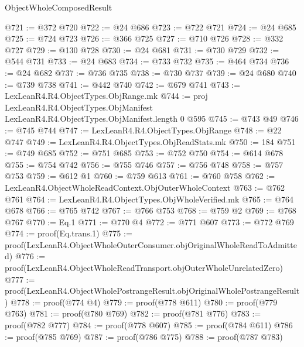 \begin{lexlean}{ObjectWholeComposedResult}
\begin{coremodule}
@721 := @372 @720
@722 := @24 @686
@723 := @722 @721
@724 := @24 @685
@725 := @724 @723
@726 := @366 @725
@727 := @710 @726
@728 := @332 @727
@729 := @130 @728
@730 := @24 @681
@731 := @730 @729
@732 := @544 @731
@733 := @24 @683
@734 := @733 @732
@735 := @464 @734
@736 := @24 @682
@737 := @736 @735
@738 := @730 @737
@739 := @24 @680
@740 := @739 @738
@741 := @442 @740
@742 := @679 @741
@743 := LexLeanR4.R4.ObjectTypes.ObjRange.mk
@744 := proj LexLeanR4.R4.ObjectTypes.ObjManifest LexLeanR4.R4.ObjectTypes.ObjManifest.length 0 @595
@745 := @743 @49
@746 := @745 @744
@747 := LexLeanR4.R4.ObjectTypes.ObjRange
@748 := @22 @747
@749 := LexLeanR4.R4.ObjectTypes.ObjReadStats.mk
@750 := 184
@751 := @749 @685
@752 := @751 @685
@753 := @752 @750
@754 := @614 @678
@755 := @754 @742
@756 := @755 @746
@757 := @756 @748
@758 := @757 @753
@759 := @612 @1
@760 := @759 @613
@761 := @760 @758
@762 := LexLeanR4.ObjectWholeReadContext.ObjOuterWholeContext
@763 := @762 @761
@764 := LexLeanR4.R4.ObjectTypes.ObjWholeVerified.mk
@765 := @764 @678
@766 := @765 @742
@767 := @766 @753
@768 := @759 @2
@769 := @768 @767
@770 := Eq.{1}
@771 := @770 @4
@772 := @771 @607
@773 := @772 @769
@774 := proof(Eq.trans.{1})
@775 := proof(LexLeanR4.ObjectWholeOuterConsumer.objOriginalWholeReadToAdmitted)
@776 := proof(LexLeanR4.ObjectWholeReadTransport.objOuterWholeUnrelatedZero)
@777 := proof(LexLeanR4.ObjectWholePostrangeResult.objOriginalWholePostrangeResult)
@778 := proof(@774 @4)
@779 := proof(@778 @611)
@780 := proof(@779 @763)
@781 := proof(@780 @769)
@782 := proof(@781 @776)
@783 := proof(@782 @777)
@784 := proof(@778 @607)
@785 := proof(@784 @611)
@786 := proof(@785 @769)
@787 := proof(@786 @775)
@788 := proof(@787 @783)
\end{coremodule}
\end{lexlean}
